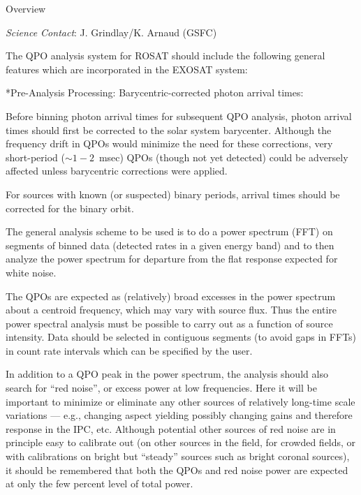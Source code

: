 %
\def\version{\it Rev.~1.0 - 4/14/86}
\def\chapter{\it Timing Analysis: QPO Analysis}


\@{Overview}

\noindent
{\it Science Contact}:  J. Grindlay/K. Arnaud (GSFC)

The QPO analysis system for ROSAT should include the following general
features which are incorporated in the EXOSAT system:

:

{\list

Before binning photon arrival times for subsequent QPO analysis,
photon arrival times should first be corrected to the solar system
barycenter.  Although the frequency drift in QPOs would minimize the
need for these corrections, very short-period ($\sim 1-2$~msec) QPOs
(though not yet detected) could be adversely affected unless
barycentric corrections were applied.

For sources with known (or suspected) binary periods, arrival times
should be corrected for the binary orbit.

}


{\list

The general analysis scheme to be used is to do a power spectrum (FFT)
on segments of binned data (detected rates in a given energy band) and
to then analyze the power spectrum for departure from the flat
response expected for white noise.

The QPOs are expected as (relatively) broad excesses in the power
spectrum about a centroid frequency, which may vary with source flux.
Thus the entire power spectral analysis must be possible to carry out
as a function of source intensity. Data should be selected in
contiguous segments (to avoid gaps in FFTs) in count rate intervals
which can be specified by the user.

In addition to a QPO peak in the power spectrum, the analysis should
also search for ``red noise'', or excess power at low frequencies.
Here it will be important to minimize or eliminate any other sources
of relatively long-time scale variations --- e.g., changing aspect
yielding possibly changing gains and therefore response in the IPC,
etc.  Although potential other sources of red noise are in principle
easy to calibrate out (on other sources in the field, for crowded
fields, or with calibrations on bright but ``steady'' sources such as
bright coronal sources), it should be remembered that both the QPOs
and red noise power are expected at only the few percent level of total
power.

}

